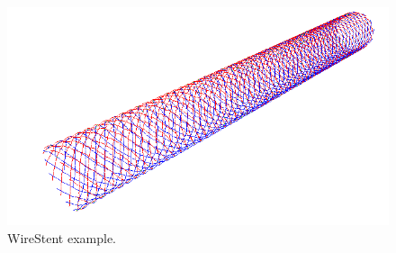 \begin{figure}[h]
  \centering
  \begin{makeimage}
  \end{makeimage}
  \begin{latexonly}
    \includegraphics[width=12cm]{images/wirestent}
  \end{latexonly}
  \begin{htmlonly}
  \end{htmlonly}  
  \caption{WireStent example.}
\end{figure}

